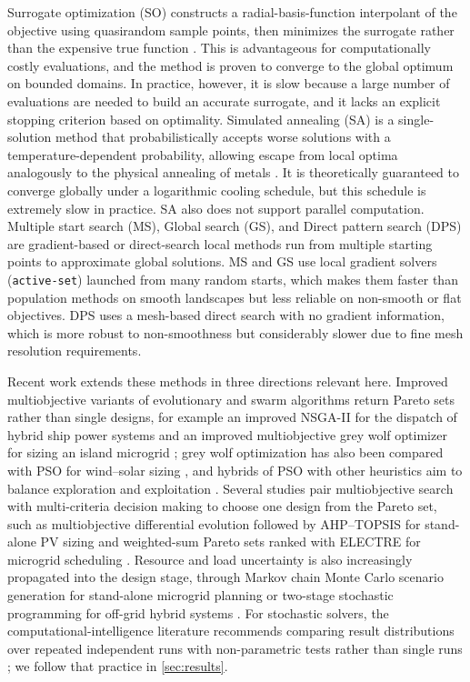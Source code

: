 \documentclass[final,3p,times]{elsarticle}
\begin{document}
Surrogate optimization (SO) constructs a radial-basis-function interpolant of the objective using quasirandom sample points, then minimizes the surrogate rather than the expensive true function \cite{gutmann2001}. This is advantageous for computationally costly evaluations, and the method is proven to converge to the global optimum on bounded domains. In practice, however, it is slow because a large number of evaluations are needed to build an accurate surrogate, and it lacks an explicit stopping criterion based on optimality. Simulated annealing (SA) is a single-solution method that probabilistically accepts worse solutions with a temperature-dependent probability, allowing escape from local optima analogously to the physical annealing of metals \cite{fathima2015}. It is theoretically guaranteed to converge globally under a logarithmic cooling schedule, but this schedule is extremely slow in practice. SA also does not support parallel computation. Multiple start search (MS), Global search (GS), and Direct pattern search (DPS) are gradient-based or direct-search local methods run from multiple starting points to approximate global solutions. MS and GS use local gradient solvers (\texttt{active-set}) launched from many random starts, which makes them faster than population methods on smooth landscapes but less reliable on non-smooth or flat objectives. DPS uses a mesh-based direct search with no gradient information, which is more robust to non-smoothness but considerably slower due to fine mesh resolution requirements.

Recent work extends these methods in three directions relevant here. Improved multiobjective variants of evolutionary and swarm algorithms return Pareto sets rather than single designs, for example an improved NSGA-II for the dispatch of hybrid ship power systems \cite{wang2024nsga} and an improved multiobjective grey wolf optimizer for sizing an island microgrid \cite{zhu2020imogwo}; grey wolf optimization has also been compared with PSO for wind--solar sizing \cite{geleta2022gwo}, and hybrids of PSO with other heuristics aim to balance exploration and exploitation \cite{javidrad2017psosa}. Several studies pair multiobjective search with multi-criteria decision making to choose one design from the Pareto set, such as multiobjective differential evolution followed by AHP--TOPSIS for stand-alone PV sizing \cite{muhsen2019mode} and weighted-sum Pareto sets ranked with ELECTRE for microgrid scheduling \cite{karimi2019madm}. Resource and load uncertainty is also increasingly propagated into the design stage, through Markov chain Monte Carlo scenario generation for stand-alone microgrid planning \cite{bakhtiari2021mcmc} or two-stage stochastic programming for off-grid hybrid systems \cite{calabrese2026tssp}. For stochastic solvers, the computational-intelligence literature recommends comparing result distributions over repeated independent runs with non-parametric tests rather than single runs \cite{derrac2011tutorial,carrasco2020trends}; we follow that practice in \cref{sec:results}.
\end{document}

